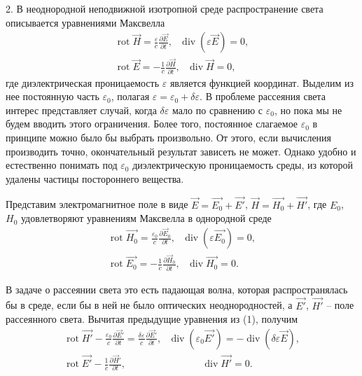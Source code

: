\documentclass[14pt]{article}
\begin{document}
2. В неоднородной неподвижной изотропной среде распространение света описывается уравнениями Максвелла
\begin{equation}
\begin{aligned}
	\operatorname{rot}\vec{H} = \frac{\varepsilon}{c}\frac{\partial\vec E}{\partial t},~~~\operatorname{div}(\varepsilon\vec{E}) = 0,\\
	\operatorname{rot}\vec{E} = -\frac{1}{c}\frac{\partial\vec H}{\partial t},~~~\operatorname{div}\vec{H} = 0,
\end{aligned}
\end{equation}
где диэлектрическая проницаемость $\varepsilon$ является функцией координат. Выделим из нее постоянную часть $\varepsilon_0$, полагая
$\varepsilon = \varepsilon_0 + \delta\varepsilon$. В проблеме рассеяния света интерес представляет случай, когда $\delta\varepsilon$ мало по сравнению с $\varepsilon_0$, но пока мы не будем вводить этого ограничения. Более того, постоянное слагаемое $\varepsilon_0$ в принципе можно было бы выбрать произвольно. От этого, если вычисления производить точно, окончательный результат зависеть не может. Однако удобно и естественно понимать под $\varepsilon_0$ диэлектрическую проницаемость среды, из которой удалены частицы постороннего вещества.

Представим электромагнитное поле в виде $\vec{E} = \vec{E_0} + \vec{E'}$, $\vec{H} = \vec{H_0} + \vec{H'}$, где $E_0$, $H_0$ удовлетворяют уравнениям Максвелла в однородной среде
$$
\begin{aligned}
	\operatorname{rot}\vec{H_0} = \frac{\varepsilon_0}{c}\frac{\partial\vec E_0}{\partial t},~~~\operatorname{div}(\varepsilon\vec{E_0}) = 0,\\
	\operatorname{rot}\vec{E_0} = -\frac{1}{c}\frac{\partial\vec H_0}{\partial t},~~~\operatorname{div}\vec{H_0} = 0.
\end{aligned}
$$

В задаче о рассеянии света это есть падающая волна, которая распространялась бы в среде, если бы в ней не было оптических неоднородностей, а $\vec{E'}$, $\vec{H'}$ -- поле рассеянного света. Вычитая предыдущие уравнения из (1), получим
\begin{equation}
\begin{aligned}
	\operatorname{rot}\vec{H'} - \frac{\varepsilon_0}{c}\frac{\partial\vec E'}{\partial t} = \frac{\delta\varepsilon}{c}\frac{\partial\vec E'}{\partial t},~~~
	\operatorname{div}(\varepsilon_0\vec{E'}) = -\operatorname{div}(\delta\varepsilon\vec{E}),	\\
	\operatorname{rot}\vec{E'} - \frac{1}{c}\frac{\partial\vec H'}{\partial t},~~~~~~~~~~~~~~~~~~~~~~~~~~~~~~~~~~~\operatorname{div}\vec{H'} = 0.
\end{aligned}
\end{equation}
\end{document}
